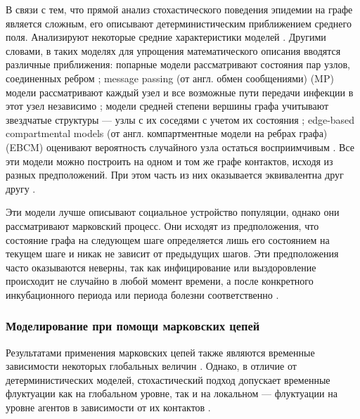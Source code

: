 \documentclass[a4paper,12pt]{article} %
\begin{document}
В связи с тем, что прямой анализ стохастического поведения эпидемии на графе является сложным, его описывают детерминистическим приближением среднего поля. Анализируют некоторые средние характеристики моделей \cite{sherborne2018mean}. Другими словами, в таких моделях для упрощения математического описания вводятся различные приближения: попарные модели рассматривают состояния пар узлов, соединенных ребром \cite{keeling1999effects, house2011insights}; message passing (от англ. обмен сообщениями) (MP) модели рассматривают каждый узел и все возможные пути передачи инфекции в этот узел независимо \cite{karrer2010message}; модели средней степени вершины графа учитывают звездчатые структуры --- узлы с их соседями с учетом их состояния \cite{lindquist2011effective}; edge-based compartmental models (от англ. компартментные модели на ребрах графа) (EBCM) оценивают вероятность случайного узла остаться восприимчивым \cite{miller2012edge}. Все эти модели можно построить на одном и том же графе контактов, исходя из разных предположений. При этом часть из них оказывается эквивалентна друг другу \cite{sherborne2018mean}.

Эти модели лучше описывают социальное устройство популяции, однако они рассматривают марковский процесс. Они исходят из предположения, что состояние графа на следующем шаге определяется лишь его состоянием на текущем шаге и никак не зависит от предыдущих шагов. Эти предположения часто оказываются неверны, так как инфицирование или выздоровление происходит не случайно в любой момент времени, а после конкретного инкубационного периода или периода болезни соответственно \cite{keeling2005networks,volz2008sir,house2011insights}. 

\subsubsection{Моделирование при помощи марковских цепей}
Результатами применения марковских цепей также являются временные зависимости некоторых глобальных величин \cite{aiello2003new,haas1999temporal}. Однако, в отличие от детерминистических моделей, стохастический подход допускает временные флуктуации как на глобальном уровне, так и на локальном --- флуктуации на уровне агентов в зависимости от их контактов \cite{nakamura2017efficient}.
\end{document}
